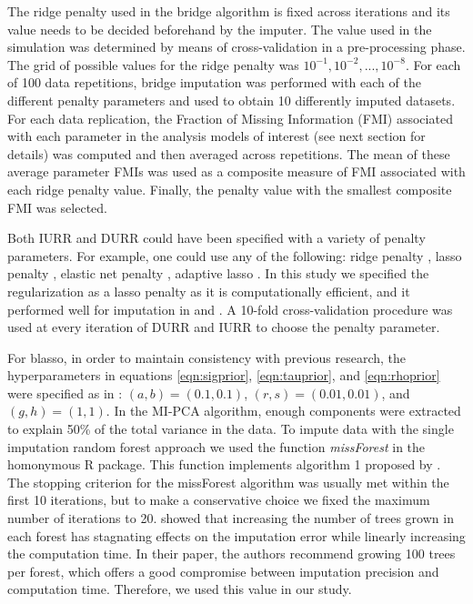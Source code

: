	The ridge penalty used in the bridge algorithm is fixed across iterations and its value needs to be
	decided beforehand by the imputer.
	The value used in the simulation was determined by means of cross-validation in a pre-processing phase.
	The grid of possible values for the ridge penalty was $10^{-1}, 10^{-2}, ..., 10^{-8}$.
	For each of 100 data repetitions, bridge imputation was performed with each of the different penalty parameters
	and used to obtain 10 differently imputed datasets.
	For each data replication, the Fraction of Missing Information (FMI) \citep{savaleiRhemtulla:2012} associated with each 
	parameter in the analysis models of interest (see next section for details) was computed and then averaged across 
	repetitions.
	The mean of these average parameter FMIs was used as a composite measure of FMI associated with each ridge penalty
	value.
	Finally, the penalty value with the smallest composite FMI was selected.
		
	Both IURR and DURR could have been specified with a variety of penalty parameters.
	For example, one could use any of the following: ridge penalty \citep{hoerlKennard:1970}, lasso penalty 
	\citep{tibshirani:1996}, elastic net penalty \citep{zouHastie:2005}, adaptive lasso \citep{zou:2006}.
	In this study we specified the regularization as a lasso penalty as it is computationally efficient, and it 
	performed well for imputation in \cite{zhaoLong:2016} and \cite{dengEtAl:2016}.
	A 10-fold cross-validation procedure was used at every iteration of DURR and IURR to choose the penalty parameter.

	For blasso, in order to maintain consistency with previous research, the hyperparameters in equations 
	\eqref{eqn:sigprior}, \eqref{eqn:tauprior}, and \eqref{eqn:rhoprior} were specified as in \cite{zhaoLong:2016}: 
	$(a,b)=(0.1, 0.1)$, $(r,s)=(0.01, 0.01)$, and $(g,h)=(1,1)$.
	In the MI-PCA algorithm, enough components were extracted to explain 50\% of the total variance in the data.
	To impute data with the single imputation random forest approach we used the function \emph{missForest} in the 
	homonymous R package.
	This function implements algorithm 1 proposed by \cite{stekhovenBuhlmann:2011}.
	The stopping criterion for the missForest algorithm was usually met within the first 10 iterations, 
	but to make a conservative choice we fixed the maximum number of iterations to 20.
	\cite{stekhovenBuhlmann:2011} showed that increasing the number of trees grown in each forest has 
	stagnating effects on the imputation error while linearly increasing the computation time.
	In their paper, the authors recommend growing 100 trees per forest, which offers a good compromise 
	between imputation precision and computation time.
	Therefore, we used this value in our study.

